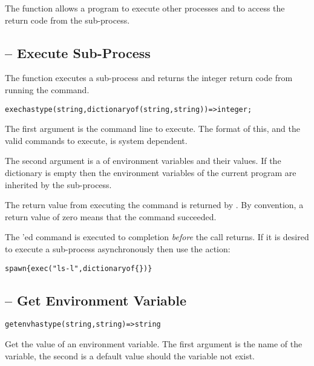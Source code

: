 The  function allows a \Sr program to execute other processes and to access the return code from the sub-process.

\subsection{ -- Execute Sub-Process}
\label{exec}

The  function executes a sub-process and returns the integer return code from running the command.

\begin{alltt}
exec has type (string,dictionary of (string,string))=>integer;
\end{alltt}

The first argument is the command line to execute. The format of this, and the valid commands to execute, is system dependent.

The second argument is a  of environment variables and their values. If the dictionary is empty then the environment variables of the current program are inherited by the sub-process.

The return value from executing the command is returned by . By convention, a return value of zero means that the command succeeded.

\begin{aside}
The 'ed command is executed to completion \emph{before} the  call returns. If it is desired to execute a sub-process asynchronously then use the  action:
\begin{alltt}
spawn\{ exec("ls -l", dictionary of \{\}) \}
\end{alltt}
\end{aside}


\subsection{ -- Get Environment Variable}
\label{getenv}

\begin{alltt}
getenv has type (string,string)=>string
\end{alltt}

Get the value of an environment variable. The first argument is the name of the variable, the second is a default value should the variable not exist.

